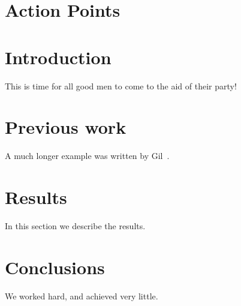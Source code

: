 \documentclass[12pt]{article}
\begin{document}
\maketitle

\section{Action Points}


\section{Introduction}
This is time for all good men to come to the aid of their party!


\section{Previous work}\label{previous work}
A much longer example was written by Gil~\cite{Gil:02}.

\section{Results}\label{results}
In this section we describe the results.

\section{Conclusions}\label{conclusions}
We worked hard, and achieved very little.



\end{document}
